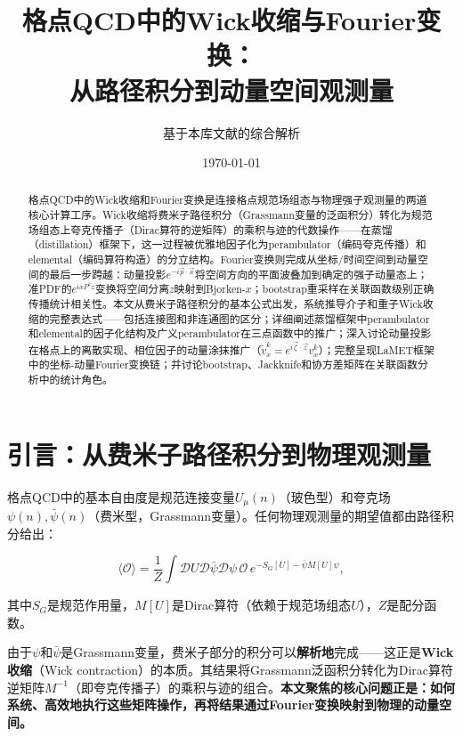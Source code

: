 \documentclass[12pt,a4paper]{ctexart}
\title{\heiti 格点QCD中的Wick收缩与Fourier变换：\\
从路径积分到动量空间观测量}
\author{基于本库文献的综合解析}
\date{\today}
\theoremstyle{definition}
\begin{document}
\maketitle

\begin{abstract}
\noindent
格点QCD中的Wick收缩和Fourier变换是连接格点规范场组态与物理强子观测量的两道核心计算工序。Wick收缩将费米子路径积分（Grassmann变量的泛函积分）转化为规范场组态上夸克传播子（Dirac算符的逆矩阵）的乘积与迹的代数操作——在蒸馏（distillation）框架下，这一过程被优雅地因子化为perambulator（编码夸克传播）和elemental（编码算符构造）的分立结构。Fourier变换则完成从坐标/时间空间到动量空间的最后一步跨越：动量投影$e^{-i\vec{p}\cdot\vec{x}}$将空间方向的平面波叠加到确定的强子动量态上；准PDF的$e^{ixP^zz}$变换将空间分离$z$映射到Bjorken-$x$；bootstrap重采样在关联函数级别正确传播统计相关性。本文从费米子路径积分的基本公式出发，系统推导介子和重子Wick收缩的完整表达式——包括连接图和非连通图的区分；详细阐述蒸馏框架中perambulator和elemental的因子化结构及广义perambulator在三点函数中的推广；深入讨论动量投影在格点上的离散实现、相位因子的动量涂抹推广（$\tilde{v}^k_x = e^{i\vec{\zeta}\cdot\vec{z}}v^k_x$）；完整呈现LaMET框架中的坐标-动量Fourier变换链；并讨论bootstrap、Jackknife和协方差矩阵在关联函数分析中的统计角色。
\end{abstract}

\tableofcontents
\newpage

\section{引言：从费米子路径积分到物理观测量}

格点QCD中的基本自由度是规范连接变量$U_\mu(n)$（玻色型）和夸克场$\psi(n), \bar{\psi}(n)$（费米型，Grassmann变量）。任何物理观测量的期望值都由路径积分给出\cite{Peardon2009}：

\begin{equation}
\langle \mathcal{O} \rangle = \frac{1}{Z} \int \mathcal{D}U \mathcal{D}\bar{\psi} \mathcal{D}\psi \, \mathcal{O} \, e^{-S_G[U] - \bar{\psi}M[U]\psi},
\label{eq:path_integral}
\end{equation}

其中$S_G$是规范作用量，$M[U]$是Dirac算符（依赖于规范场组态$U$），$Z$是配分函数。

由于$\psi$和$\bar{\psi}$是Grassmann变量，费米子部分的积分可以\textbf{解析地}完成——这正是\textbf{Wick收缩}（Wick contraction）的本质。其结果将Grassmann泛函积分转化为Dirac算符逆矩阵$M^{-1}$（即夸克传播子）的乘积与迹的组合。\textbf{本文聚焦的核心问题正是：如何系统、高效地执行这些矩阵操作，再将结果通过Fourier变换映射到物理的动量空间。}
\end{document}
